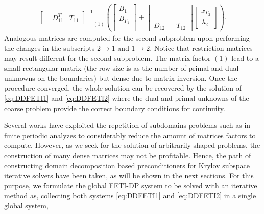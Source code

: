 \begin{multline}
{\begin{bmatrix}
 & D_{11}^T  & T_{11}
\end{bmatrix}^{-1}
}_{(1)}
\left(
\begin{bmatrix}
B_{1}\\
B_{\Gamma_1}\\
\phantom{x}
\end{bmatrix}
+
\begin{bmatrix}
\phantom{A} & \phantom{A}\\
\phantom{A} & \phantom{A}\\
D_{12}  & -T_{12}
\end{bmatrix}
\begin{bmatrix}
x_{\Gamma_2}\\
\lambda_{2}
\end{bmatrix}
\right).
\end{multline}
\noindent Analogous matrices are computed for the second subproblem upon performing the changes in the subscripts $2 \rightarrow 1$ and $1 \rightarrow 2$. Notice that restriction matrices may result different for the second subproblem. The matrix factor $(1)$ lead to a small rectangular matrix (the row size is as the number of primal and dual unknowns on the boundaries) but dense due to matrix inversion. Once the procedure converged, the whole solution can be recovered by the solution of \eqref{eq:DDFETI1} and \eqref{eq:DDFETI2} where the dual and primal unknowns of the coarse problem provide the correct boundary conditions for continuity.

Several works\cite{Vouvakis2004,lee2005non,Vouvakis2006, li2006vector} have exploited the repetition of subdomains problems such as in finite periodic analyzes to considerably reduce the amount of matrices factors to compute. However, as we seek for the solution of arbitrarily shaped problems, the construction of many dense matrices may not be profitable. Hence, the path of constructing domain decomposition based preconditioners for Krylov subspace iterative solvers have been taken, as will be shown in the next sections. For this purpose, we formulate the global FETI-DP system to be solved with an iterative method as, collecting both systems \eqref{eq:DDFETI1} and \eqref{eq:DDFETI2} in a single global system,

